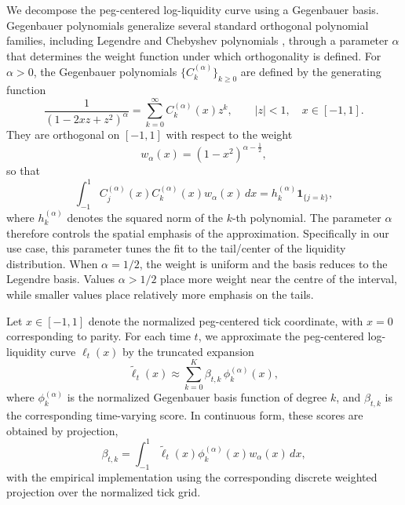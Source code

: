 \documentclass[a4paper,fleqn]{cas-sc}
\begin{document}
We decompose the peg-centered log-liquidity curve using a Gegenbauer basis. Gegenbauer polynomials generalize several standard orthogonal polynomial families, including Legendre and Chebyshev polynomials \citep{kde_cl}, through a parameter $\alpha$ that determines the weight function under which orthogonality is defined. For $\alpha>0$, the Gegenbauer polynomials $\{C_k^{(\alpha)}\}_{k\geq 0}$ are defined by the generating function
\begin{equation}
    \frac{1}{(1 - 2xz + z^2)^{\alpha}}
    =
    \sum_{k=0}^{\infty} C_k^{(\alpha)}(x) z^k,
    \qquad |z|<1,\quad x\in[-1,1].
\end{equation}
They are orthogonal on $[-1,1]$ with respect to the weight
\begin{equation}
    w_{\alpha}(x) = (1-x^2)^{\alpha-\frac{1}{2}},
\end{equation}
so that
\begin{equation}
    \int_{-1}^{1}
    C_j^{(\alpha)}(x) C_k^{(\alpha)}(x)
    w_{\alpha}(x)\,dx
    =
    h_k^{(\alpha)} \mathbf{1}_{\{j=k\}},
\end{equation}
where $h_k^{(\alpha)}$ denotes the squared norm of the $k$-th polynomial. The parameter $\alpha$ therefore controls the spatial emphasis of the approximation. Specifically in our use case, this parameter tunes the fit to the tail/center of the liquidity distribution. When $\alpha=1/2$, the weight is uniform and the basis reduces to the Legendre basis. Values $\alpha>1/2$ place more weight near the centre of the interval, while smaller values place relatively more emphasis on the tails.

Let $x\in[-1,1]$ denote the normalized peg-centered tick coordinate, with $x=0$ corresponding to parity. For each time $t$, we approximate the peg-centered log-liquidity curve $\ell_t(x)$ by the truncated expansion
\begin{equation}
    \tilde{\ell}_t(x)
    \approx
    \sum_{k=0}^{K} \beta_{t,k}\,\phi_k^{(\alpha)}(x),
\end{equation}
where $\phi_k^{(\alpha)}$ is the normalized Gegenbauer basis function of degree $k$, and $\beta_{t,k}$ is the corresponding time-varying score. In continuous form, these scores are obtained by projection,
\begin{equation}
    \beta_{t,k}
    =
    \int_{-1}^{1}
    \tilde{\ell}_t(x)\phi_k^{(\alpha)}(x) w_{\alpha}(x)\,dx,
\end{equation}
with the empirical implementation using the corresponding discrete weighted projection over the normalized tick grid.
\end{document}
